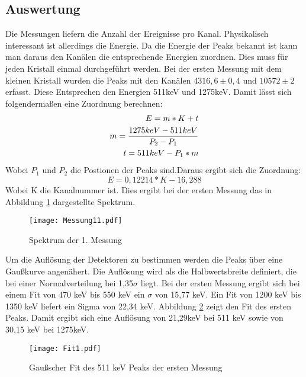 \documentclass[a4paper,11pt,twoside]{article}
\begin{document}
\subsection{Auswertung}
Die Messungen liefern die Anzahl der Ereignisse pro Kanal. Physikalisch interessant ist allerdings die Energie. Da die Energie der Peaks bekannt ist kann man daraus den Kanälen die entsprechende Energien zuordnen. Dies muss für jeden Kristall einmal durchgeführt werden. Bei der ersten Messung mit dem kleinen Kristall wurden die Peaks mit den Kanälen $4316,6\pm0,4$ und $10572\pm2$ erfasst. Diese Entsprechen den Energien 511keV und 1275keV. 
Damit lässt sich folgendermaßen eine Zuordnung berechnen:
%
\begin{align}
E=m*K+t\\
m={{1275keV-511keV}\over{P_2-P_1}}\\
t=511keV-P_1*m
\end{align}
%
Wobei $P_1$ und $P_2$ die Postionen der Peaks sind.Daraus ergibt sich die Zuordnung:
%
\begin{equation}
E=0,12214*K-16,288
\end{equation}
%
Wobei K die Kanalnummer ist.
Dies ergibt bei der ersten Messung das in Abbildung \ref{l1} dargestellte Spektrum.
%
\begin{figure}[htbp]
	\begin{center}
		\texttt{[image: Messung11.pdf]}
		\caption{Spektrum der 1. Messung}
		\label{l1}
	\end{center}
\end{figure}
%
Um die Auflösung der Detektoren zu bestimmen werden die Peaks über eine Gaußkurve angenähert. Die Auflösung wird als die Halbwertsbreite definiert, die bei einer Normalverteilung bei 1,35$\sigma$ liegt. Bei der ersten Messung ergibt sich bei einem Fit von 470 keV bis 550 keV ein $\sigma$ von 15,77 keV. Ein Fit von 1200 keV bis 1350 keV liefert ein Sigma von 22,34 keV. Abbildung \ref{l2} zeigt den Fit des ersten Peaks. Damit ergibt sich eine Auflösung von 21,29keV bei 511 keV sowie von 30,15 keV bei 1275keV.
%
\begin{figure}[htbp]
	\begin{center}
		\texttt{[image: Fit1.pdf]}
		\caption{Gaußscher Fit des 511 keV Peaks der ersten Messung}
		\label{l2}
	\end{center}
\end{figure}
%
\end{document}
